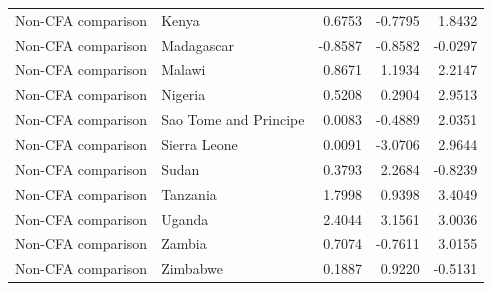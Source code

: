 \begin{table}
\begin{tabular}[t]{llrrr}
Non-CFA comparison & Kenya & 0.6753 & -0.7795 & 1.8432\\
\addlinespace
Non-CFA comparison & Madagascar & -0.8587 & -0.8582 & -0.0297\\
Non-CFA comparison & Malawi & 0.8671 & 1.1934 & 2.2147\\
Non-CFA comparison & Nigeria & 0.5208 & 0.2904 & 2.9513\\
Non-CFA comparison & Sao Tome and Principe & 0.0083 & -0.4889 & 2.0351\\
Non-CFA comparison & Sierra Leone & 0.0091 & -3.0706 & 2.9644\\
\addlinespace
Non-CFA comparison & Sudan & 0.3793 & 2.2684 & -0.8239\\
Non-CFA comparison & Tanzania & 1.7998 & 0.9398 & 3.4049\\
Non-CFA comparison & Uganda & 2.4044 & 3.1561 & 3.0036\\
Non-CFA comparison & Zambia & 0.7074 & -0.7611 & 3.0155\\
Non-CFA comparison & Zimbabwe & 0.1887 & 0.9220 & -0.5131\\
\bottomrule
\end{tabular}
\end{table}